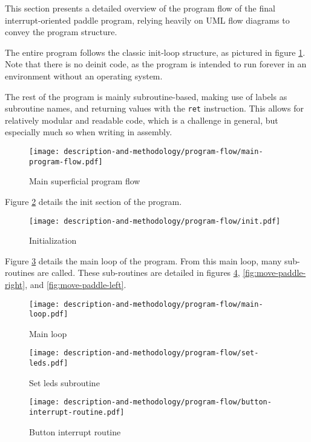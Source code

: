 This section presents a detailed overview of the program flow of the final interrupt-oriented paddle program, relying heavily on UML flow diagrams to convey the program structure.

The entire program follows the classic init-loop structure, as pictured in figure \ref{fig:main-program-flow}. Note that there is no deinit code, as the program is intended to run forever in an environment without an operating system.

The rest of the program is mainly subroutine-based, making use of labels as subroutine names, and returning values with the \texttt{ret} instruction. This allows for relatively modular and readable code, which is a challenge in general, but especially much so when writing in assembly.

\begin{figure}
\texttt{[image: description-and-methodology/program-flow/main-program-flow.pdf]}
\caption{Main superficial program flow}
\label{fig:main-program-flow}
\end{figure}

Figure \ref{fig:init} details the init section of the program.

\begin{figure}
\texttt{[image: description-and-methodology/program-flow/init.pdf]}
\caption{Initialization}
\label{fig:init}
\end{figure}

Figure \ref{fig:main-loop} details the main loop of the program. From this main loop, many sub-routines are called. These sub-routines are detailed in figures \ref{fig:set-leds}, \ref{fig:move-paddle-right}, and \ref{fig:move-paddle-left}.

\begin{figure}
\texttt{[image: description-and-methodology/program-flow/main-loop.pdf]}
\caption{Main loop}
\label{fig:main-loop}
\end{figure}

\begin{figure}
\texttt{[image: description-and-methodology/program-flow/set-leds.pdf]}
\caption{Set leds subroutine}
\label{fig:set-leds}
\end{figure}

\begin{figure}
\texttt{[image: description-and-methodology/program-flow/button-interrupt-routine.pdf]}
\caption{Button interrupt routine}
\label{fig:button-interrupt-routine}
\end{figure}

